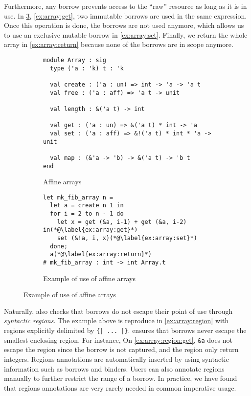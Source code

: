 Furthermore, any borrow prevents access to the ``raw''  resource
as long as it is in use. In \cref{ex:array}, \cref{ex:array:get},
two immutable borrows are used in the same expression. Once this operation
is done, the borrows are not used anymore, which allows us to use
an exclusive mutable borrow in \cref{ex:array:set}.
Finally, we return the whole array in \cref{ex:array:return} because
none of the borrows are in scope anymore.

\begin{figure}
  \centering
  \begin{subfigure}{0.48\linewidth}
\begin{lstlisting}
module Array : sig
  type ('a : 'k) t : 'k
  
  val create : ('a : un) => int -> 'a -> 'a t
  val free : ('a : aff) => 'a t -> unit

  val length : &('a t) -> int

  val get : ('a : un) => &('a t) * int -> 'a
  val set : ('a : aff) => &!('a t) * int * 'a -> unit
  
  val map : (&'a -> 'b) -> &('a t) -> 'b t
end
\end{lstlisting}
    \caption{Affine arrays}
    \label{sig:array}
  \end{subfigure}\hfill
  \begin{subfigure}{0.5\linewidth}
\begin{lstlisting}
let mk_fib_array n =
  let a = create n 1 in
  for i = 2 to n - 1 do
    let x = get (&a, i-1) + get (&a, i-2) in(*@\label{ex:array:get}*)
    set (&!a, i, x)(*@\label{ex:array:set}*)
  done;
  a(*@\label{ex:array:return}*)
# mk_fib_array : int -> int Array.t
\end{lstlisting}
    \caption{Example of use of affine arrays}
    \label{ex:array}
  \end{subfigure}
\end{figure}

Naturally, \lang also checks that borrows do not escape their point
of use through {\em syntactic regions}. The example
above is reproduce in \cref{ex:array:region} with
regions explicitly delimited by \lstinline/{| ... |}/.
\lang ensures that borrows never escape the smallest enclosing
region.
For instance, On \cref{ex:array:region:get}, \lstinline/&a/ does
not escape the region since the borrow is not captured, and the
region only return integers.
Regions annotations are automatically inserted by \lang using
syntactic information such as borrows and binders.
Users can also annotate regions manually to further restrict the range
of a borrow. In practice, we have found that regions
annotations are very rarely needed in common imperative usage.


